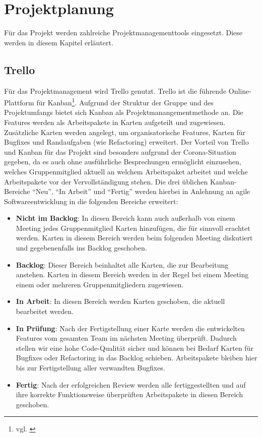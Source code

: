 \section{Projektplanung}
Für das Projekt werden zahlreiche Projektmanagementtools eingesetzt.
Diese werden in diesem Kapitel erläutert.
\subsection*{Trello}
Für das Projektmanagement wird Trello genutzt.
Trello ist die führende Online-Plattform für Kanban\footnote{vgl. \cite{atlassian}}.
Aufgrund der Struktur der Gruppe und des Projektumfangs bietet sich Kanban als Projektmanangementmethode an.
Die Features werden als Arbeitspakete in Karten aufgeteilt und zugewiesen.
Zusätzliche Karten werden angelegt, um organisatorische Features, Karten für Bugfixes und Randaufgaben (wie Refactoring) erweitert.
Der Vorteil von Trello und Kanban für das Projekt sind besonders aufgrund der Corona-Situation gegeben, da es auch ohne ausführliche Besprechungen ermöglicht einzusehen, welches Gruppenmitglied aktuell an welchem Arbeitspaket arbeitet und welche Arbeitspakete vor der Vervollständigung stehen.
Die drei üblichen Kanban-Bereiche \enquote{Neu}, \enquote{In Arbeit} und \enquote{Fertig} werden hierbei in Anlehnung an agile Softwareentwicklung in die folgenden Bereiche erweitert:
\begin{itemize}
    \item \textbf{Nicht im Backlog}: In diesen Bereich kann auch außerhalb von einem Meeting jedes Gruppenmitglied Karten hinzufügen, die für sinnvoll erachtet werden. Karten in diesem Bereich werden beim folgenden Meeting diskutiert und gegebenenfalls ins Backlog geschoben.
    \item \textbf{Backlog}: Dieser Bereich beinhaltet alle Karten, die zur Bearbeitung anstehen. Karten in diesem Bereich werden in der Regel bei einem Meeting einem oder mehreren Gruppenmitgliedern zugewiesen.
    \item \textbf{In Arbeit}: In diesen Bereich werden Karten geschoben, die aktuell bearbeitet werden.
    \item \textbf{In Prüfung}: Nach der Fertigstellung einer Karte werden die entwickelten Features vom gesamten Team im nächsten Meeting überprüft. Dadurch stellen wir eine hohe Code-Qualität sicher und können bei Bedarf Karten für Bugfixes oder Refactoring in das Backlog schieben. Arbeitspakete bleiben hier bis zur Fertigstellung aller verwandten Bugfixes.
    \item \textbf{Fertig}: Nach der erfolgreichen Review werden alle fertiggestellten und auf ihre korrekte Funktionsweise überprüften Arbeitspakete in diesen Bereich geschoben.
\end{itemize}

